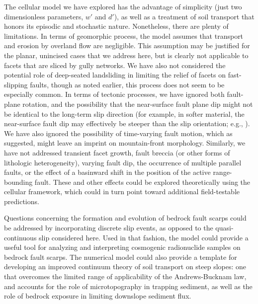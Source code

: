 The cellular model we have explored has the advantage of simplicity (just two dimensionless parameters, $w'$ and $d'$), as well as a treatment of soil transport that honors its episodic and stochastic nature. Nonetheless, there are plenty of limitations. In terms of geomorphic process, the model assumes that transport and erosion by overland flow are negligible. This assumption may be justified for the planar, unincised cases that we address here, but is clearly not applicable to facets that are sliced by gully networks. We have also not considered the potential role of deep-seated landsliding in limiting the relief of facets on fast-slipping faults, though as noted earlier, this process does not seem to be especially common. In terms of tectonic processes, we have ignored both fault-plane rotation, and the possibility that the near-surface fault plane dip might not be identical to the long-term slip direction (for example, in softer material, the near-surface fault dip may effectively be steeper than the slip orientation; e.g., \citet{mccalpin2009paleoseismology}). We have also ignored the possibility of time-varying fault motion, which as \citet{hamblin1976patterns} suggested, might leave an imprint on mountain-front morphology. Similarly, we have not addressed transient facet growth, fault breccia (or other forms of lithologic heterogeneity), varying fault dip, the occurrence of multiple parallel faults, or the effect of a basinward shift in the position of the active range-bounding fault. These and other effects could be explored theoretically using the cellular framework, which could in turn point toward additional field-testable predictions.

Questions concerning the formation and evolution of bedrock fault scarps could be addressed by incorporating discrete slip events, as opposed to the quasi-continuous slip considered here. Used in that fashion, the model could provide a useful tool for analyzing and interpreting cosmogenic radionuclide samples on bedrock fault scarps. The numerical model could also provide a template for developing an improved continuum theory of soil transport on steep slopes: one that overcomes the limited range of applicability of the Andrews-Bucknam law, and accounts for the role of microtopography in trapping sediment, as well as the role of bedrock exposure in limiting downslope sediment flux.




